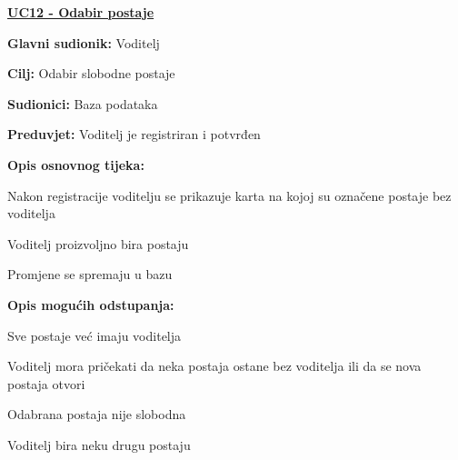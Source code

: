 					\noindent \underline{\textbf{UC12 - Odabir postaje}}
					\begin{packed_item}
						\item \textbf{Glavni sudionik:} Voditelj
						\item \textbf{Cilj:} Odabir slobodne postaje
						\item \textbf{Sudionici:} Baza podataka
						\item \textbf{Preduvjet:} Voditelj je registriran i potvrđen
						\item \textbf{Opis osnovnog tijeka:}
						\begin{packed_enum}
							\item Nakon registracije voditelju se prikazuje karta na kojoj su označene postaje bez voditelja
							\item Voditelj proizvoljno bira postaju
							\item Promjene se spremaju u bazu
						\end{packed_enum}
						\item \textbf{Opis mogućih odstupanja:}
						\begin{packed_item}
							\item[2.a] Sve postaje već imaju voditelja 
							\begin{packed_enum}
								\item Voditelj mora pričekati da neka postaja ostane bez voditelja ili da se nova postaja otvori
							\end{packed_enum}
							\item[2.b] Odabrana postaja nije slobodna
							\begin{packed_enum}
								\item Voditelj bira neku drugu postaju
							\end{packed_enum}
						\end{packed_item}
					\end{packed_item}
					
